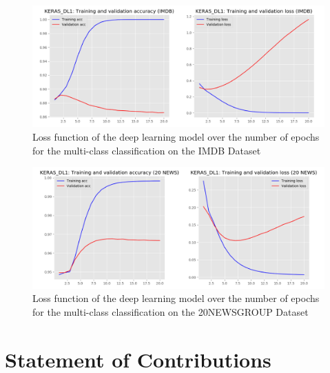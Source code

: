 \documentclass[conference]{IEEEtran}
\begin{document}
\begin{figure}[H]

\centering
\includegraphics[scale = 0.22]{figs/deep_learning_using_keras/results_imdb_using_multi_class_classification/20_epochs/KERAS_DL1_IMDB_REVIEWS_training_and_validation_accuracy_and_Loss.png}
\caption[Loss function of the deep learning model over the number of epochs for the multi-class classification on the IMDB Dataset]{Loss function of the deep learning model over the number of epochs for the multi-class classification on the IMDB Dataset}
\label{fig:dl_imdb_multikeras}
\end{figure}

\begin{figure}[H]
\centering
\includegraphics[scale = 0.22]{figs/deep_learning_using_keras/results_20newsgroups_and_imdb_using_binary_classification/20_epochs/KERAS_DL1_TWENTY_NEWS_GROUPS_training_and_validation_accuracy_and_Loss.png}
\caption[Loss function of the deep learning model over the number of epochs for the multi-class classification on the 20NEWSGROUP Dataset]{Loss function of the deep learning model over the number of epochs for the multi-class classification on the 20NEWSGROUP Dataset}
\label{fig:dl_20newskeras}
\end{figure}

\section{Statement of Contributions}
\label{section:contributions}
\end{document}
